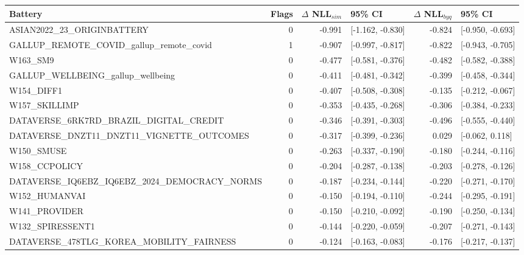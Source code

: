 \begin{tabular}{lr r l r l}\toprule
Battery & Flags & $\Delta$ NLL$_{sim}$ & 95\% CI & $\Delta$ NLL$_{byq}$ & 95\% CI \\
\midrule
ASIAN2022\_23\_ORIGINBATTERY & 0 & -0.991 & [-1.162, -0.830] & -0.824 & [-0.950, -0.693] \\
GALLUP\_REMOTE\_COVID\_gallup\_remote\_covid & 1 & -0.907 & [-0.997, -0.817] & -0.822 & [-0.943, -0.705] \\
W163\_SM9 & 0 & -0.477 & [-0.581, -0.376] & -0.482 & [-0.582, -0.388] \\
GALLUP\_WELLBEING\_gallup\_wellbeing & 0 & -0.411 & [-0.481, -0.342] & -0.399 & [-0.458, -0.344] \\
W154\_DIFF1 & 0 & -0.407 & [-0.508, -0.308] & -0.135 & [-0.212, -0.067] \\
W157\_SKILLIMP & 0 & -0.353 & [-0.435, -0.268] & -0.306 & [-0.384, -0.233] \\
DATAVERSE\_6RK7RD\_BRAZIL\_DIGITAL\_CREDIT & 0 & -0.346 & [-0.391, -0.303] & -0.496 & [-0.555, -0.440] \\
DATAVERSE\_DNZT11\_DNZT11\_VIGNETTE\_OUTCOMES & 0 & -0.317 & [-0.399, -0.236] & 0.029 & [-0.062, 0.118] \\
W150\_SMUSE & 0 & -0.263 & [-0.337, -0.190] & -0.180 & [-0.244, -0.116] \\
W158\_CCPOLICY & 0 & -0.204 & [-0.287, -0.138] & -0.203 & [-0.278, -0.126] \\
DATAVERSE\_IQ6EBZ\_IQ6EBZ\_2024\_DEMOCRACY\_NORMS & 0 & -0.187 & [-0.234, -0.144] & -0.220 & [-0.271, -0.170] \\
W152\_HUMANVAI & 0 & -0.150 & [-0.194, -0.110] & -0.244 & [-0.295, -0.191] \\
W141\_PROVIDER & 0 & -0.150 & [-0.210, -0.092] & -0.190 & [-0.250, -0.134] \\
W132\_SPIRESSENT1 & 0 & -0.144 & [-0.220, -0.059] & -0.207 & [-0.271, -0.143] \\
DATAVERSE\_478TLG\_KOREA\_MOBILITY\_FAIRNESS & 0 & -0.124 & [-0.163, -0.083] & -0.176 & [-0.217, -0.137] \\
\bottomrule\end{tabular}
